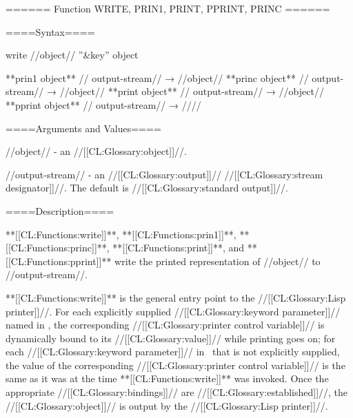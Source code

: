 ====== Function WRITE, PRIN1, PRINT, PPRINT, PRINC ======

====Syntax====

\DefunWithValuesNewline write {//object// ''&key'' } {object}

**prin1 {object** //\opt} output-stream// → //object// **princ {object** //\opt} output-stream// → //object// **print {object** //\opt} output-stream// → //object// **pprint {object** //\opt} output-stream// → //\novalues//

====Arguments and Values====

//object// - an //[[CL:Glossary:object]]//.

//output-stream// - an //[[CL:Glossary:output]]// //[[CL:Glossary:stream designator]]//. The default is //[[CL:Glossary:standard output]]//.


====Description====

**[[CL:Functions:write]]**, **[[CL:Functions:prin1]]**, **[[CL:Functions:princ]]**, **[[CL:Functions:print]]**, and **[[CL:Functions:pprint]]** write the printed representation of //object// to //output-stream//.

**[[CL:Functions:write]]** is the general entry point to the //[[CL:Glossary:Lisp printer]]//. For each explicitly supplied //[[CL:Glossary:keyword parameter]]// named in \thenextfigure, the corresponding //[[CL:Glossary:printer control variable]]// is dynamically bound to its //[[CL:Glossary:value]]// while printing goes on; for each //[[CL:Glossary:keyword parameter]]// in \thenextfigure\ that is not explicitly supplied, the value of the corresponding //[[CL:Glossary:printer control variable]]// is the same as it was at the time **[[CL:Functions:write]]** was invoked. Once the appropriate //[[CL:Glossary:bindings]]// are //[[CL:Glossary:established]]//, the //[[CL:Glossary:object]]// is output by the //[[CL:Glossary:Lisp printer]]//.


